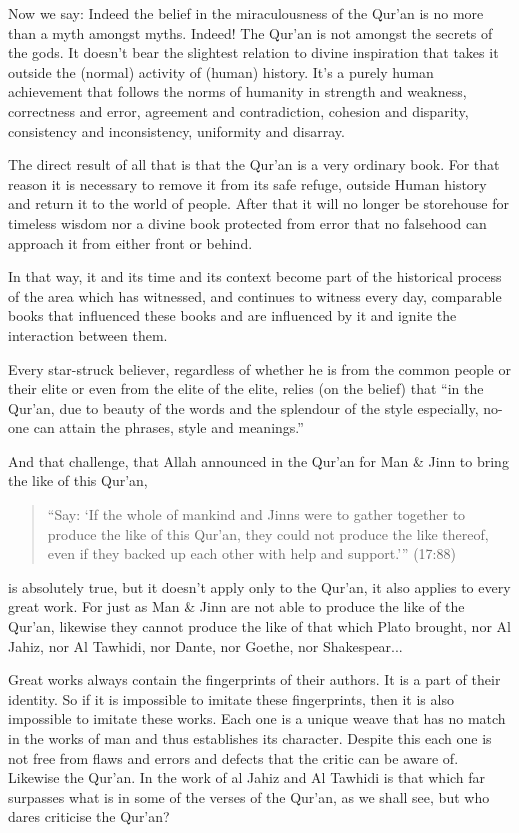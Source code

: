 \documentclass[12pt]{book}
\begin{document}
Now we say: Indeed the belief in the miraculousness of the Qur’an is no more
than a myth amongst myths. Indeed! The Qur’an is not amongst the secrets of the
gods. It doesn’t bear the slightest relation to divine inspiration that takes
it outside the (normal) activity of (human) history. It’s a purely human
achievement that follows the norms of humanity in strength and weakness,
correctness and error, agreement and contradiction, cohesion and disparity,
consistency and inconsistency, uniformity and disarray.

The direct result of all that is that the Qur’an is a very ordinary book. For
that reason it is necessary to remove it from its safe refuge, outside Human
history and return it to the world of people. After that it will no longer be
storehouse for timeless wisdom nor a divine book protected from error that no
falsehood can approach it from either front or behind.

In that way, it and its time and its context become part of the historical
process of the area which has witnessed, and continues to witness every day,
comparable books that influenced these books and are influenced by it and
ignite the interaction between them.

Every star-struck believer, regardless of whether he is from the common people
or their elite or even from the elite of the elite, relies (on the belief) that
“in the Qur’an, due to beauty of the words and the splendour of the style
especially, no-one can attain the phrases, style and meanings.”\footnotemark


And that challenge, that Allah announced in the Qur’an for Man \& Jinn to bring
the like of this Qur’an,

\begin{quote}
“Say: ‘If the whole of mankind and Jinns were to gather together to produce the
like of this Qur’an, they could not produce the like thereof, even if they
backed up each other with help and support.’” (17:88)
\end{quote}

is absolutely true, but it doesn’t apply only to the Qur’an, it also applies to
every great work. For just as Man \& Jinn are not able to produce the like of
the Qur’an, likewise they cannot produce the like of that which Plato brought,
nor Al Jahiz, nor Al Tawhidi, nor Dante, nor Goethe, nor Shakespear...

Great works always contain the fingerprints of their authors. It is a part of
their identity. So if it is impossible to imitate these fingerprints, then it
is also impossible to imitate these works. Each one is a unique weave that has
no match in the works of man and thus establishes its character. Despite this
each one is not free from flaws and errors and defects that the critic can be
aware of. Likewise the Qur’an. In the work of al Jahiz and Al Tawhidi is that
which far surpasses what is in some of the verses of the Qur’an, as we shall
see, but who dares criticise the Qur’an?
\end{document}
